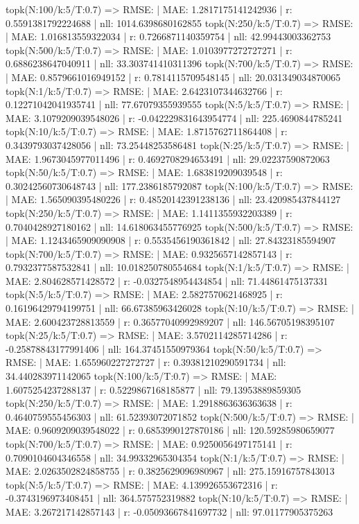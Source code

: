 topk(N:100/k:5/T:0.7) => RMSE: | MAE: 1.2817175141242936 | r: 0.5591381792224688 | nll: 1014.6398680162855
topk(N:250/k:5/T:0.7) => RMSE: | MAE: 1.016813559322034 | r: 0.7266871140359754 | nll: 42.99443003362753
topk(N:500/k:5/T:0.7) => RMSE: | MAE: 1.0103977272727271 | r: 0.6886238647040911 | nll: 33.303741410311396
topk(N:700/k:5/T:0.7) => RMSE: | MAE: 0.8579661016949152 | r: 0.7814115709548145 | nll: 20.031349034870065
topk(N:1/k:5/T:0.7) => RMSE: | MAE: 2.6423107344632766 | r: 0.12271042041935741 | nll: 77.67079355939555
topk(N:5/k:5/T:0.7) => RMSE: | MAE: 3.1079209039548026 | r: -0.042229831643954774 | nll: 225.4690844785241
topk(N:10/k:5/T:0.7) => RMSE: | MAE: 1.8715762711864408 | r: 0.3439793037428056 | nll: 73.25448253586481
topk(N:25/k:5/T:0.7) => RMSE: | MAE: 1.9673045977011496 | r: 0.4692708294653491 | nll: 29.02237590872063
topk(N:50/k:5/T:0.7) => RMSE: | MAE: 1.683819209039548 | r: 0.30242560730648743 | nll: 177.2386185792087
topk(N:100/k:5/T:0.7) => RMSE: | MAE: 1.565090395480226 | r: 0.48520142391238136 | nll: 23.420985437844127
topk(N:250/k:5/T:0.7) => RMSE: | MAE: 1.1411355932203389 | r: 0.7040428927180162 | nll: 14.618063455776925
topk(N:500/k:5/T:0.7) => RMSE: | MAE: 1.1243465909090908 | r: 0.5535456190361842 | nll: 27.84323185594907
topk(N:700/k:5/T:0.7) => RMSE: | MAE: 0.9325657142857143 | r: 0.7932377587532841 | nll: 10.018250780554684
topk(N:1/k:5/T:0.7) => RMSE: | MAE: 2.804628571428572 | r: -0.0327548954434854 | nll: 71.44861475137331
topk(N:5/k:5/T:0.7) => RMSE: | MAE: 2.5827570621468925 | r: 0.16196429794199751 | nll: 66.67385963426028
topk(N:10/k:5/T:0.7) => RMSE: | MAE: 2.600423728813559 | r: 0.36577040992989207 | nll: 146.56705198395107
topk(N:25/k:5/T:0.7) => RMSE: | MAE: 3.5702114285714286 | r: -0.25878843177991406 | nll: 164.37451550979364
topk(N:50/k:5/T:0.7) => RMSE: | MAE: 1.655960227272727 | r: 0.39381210290591734 | nll: 34.440283971142065
topk(N:100/k:5/T:0.7) => RMSE: | MAE: 1.6075254237288137 | r: 0.5229867168185877 | nll: 79.13953889859305
topk(N:250/k:5/T:0.7) => RMSE: | MAE: 1.2918863636363638 | r: 0.4640759555456303 | nll: 61.52393072071852
topk(N:500/k:5/T:0.7) => RMSE: | MAE: 0.9609209039548022 | r: 0.6853990127870186 | nll: 120.59285980659077
topk(N:700/k:5/T:0.7) => RMSE: | MAE: 0.9250056497175141 | r: 0.7090104604346558 | nll: 34.99332965304354
topk(N:1/k:5/T:0.7) => RMSE: | MAE: 2.0263502824858755 | r: 0.3825629096980967 | nll: 275.15916757843013
topk(N:5/k:5/T:0.7) => RMSE: | MAE: 4.139926553672316 | r: -0.3743196973408451 | nll: 364.575752319882
topk(N:10/k:5/T:0.7) => RMSE: | MAE: 3.267217142857143 | r: -0.05093667841697732 | nll: 97.01177905375263
